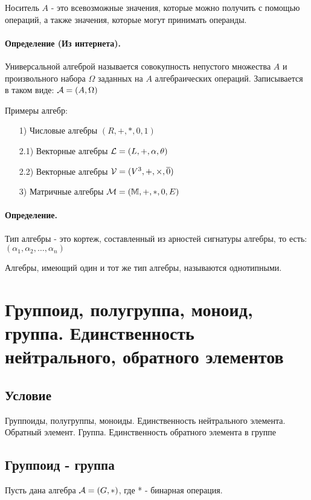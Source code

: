 \documentclass{report}
\begin{document}
\medskip

Носитель $A$ - это всевозможные значения, которые можно получить с помощью операций,
а также значения, которые могут принимать операнды.

\medskip

\paragraph*{Определение (Из интернета).}
Универсальной алгеброй называется совокупность непустого множества $A$
и произвольного набора $\Omega$ заданных на $A$ алгебраических операций.
Записывается в таком виде: ${\cal A} = (A, \Omega)$

\medskip

Примеры алгебр:
\begin{itemize}
	\item[1)] Числовые алгебры $(R, +, *, 0, 1)$
	\item[2.1)] Векторные алгебры ${\cal L} = (L, +, \alpha, \theta)$\newline
	\item[2.2)] Векторные алгебры ${\cal V} = (V^{3}, +, \times, \overline{0})$
	\item[3)] Матричные алгебры ${\cal M} = (\mathbb{M}, +, *, 0, E)$
\end{itemize}

\medskip

\paragraph*{Определение.}
Тип алгебры - это кортеж, составленный из арностей сигнатуры алгебры, то есть:
$(\alpha_{1}, \alpha_{2}, \ldots, \alpha_{n})$

Алгебры, имеющий один и тот же тип алгебры, называются однотипными.

\newpage

\section{Группоид, полугруппа, моноид, группа. Единственность нейтрального, обратного элементов}
\subsection{Условие}
Группоиды, полугруппы, моноиды. Единственность нейтрального элемента. Обратный
элемент. Группа. Единственность обратного элемента в группе

\subsection{Группоид - группа}
Пусть дана алгебра $ {\cal A} = (G, *)$, где * - бинарная операция.
\end{document}
